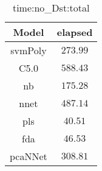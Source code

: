 \begin{table}[!ht]
	\centering
	\begin{tabular}{|c|c|}
		\hline
		Model & elapsed \\ \hline
		svmPoly & $273.99$ \\ \hline
		C5.0 & $588.43$ \\ \hline
		nb & $175.28$ \\ \hline
		nnet & $487.14$ \\ \hline
		pls & $40.51$ \\ \hline
		fda & $46.53$ \\ \hline
		pcaNNet & $308.81$ \\ \hline
	\end{tabular}
	\caption{time:no_Dst:total}
	\label{tab:time:no_Dst:total}
\end{table}
